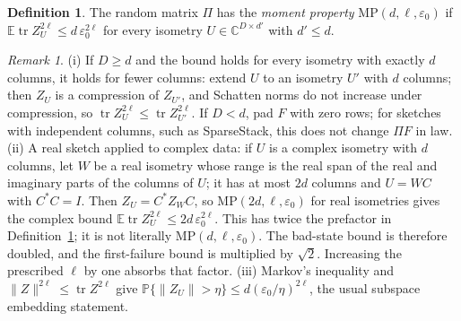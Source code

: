 \documentclass[11pt]{article}
\theoremstyle{definition}\newtheorem{definition}[theorem]{Definition}
\theoremstyle{remark}\newtheorem{remark}[theorem]{Remark}
\newcommand{\C}{\mathbb C}
\newcommand{\E}{\mathbb E}
\newcommand{\Prob}{\mathbb P}
\newcommand{\eps}{\varepsilon}
\newcommand{\tr}{\operatorname{tr}}
\newcommand{\1}{\mathbf 1}
\newcommand{\MP}{\mathrm{MP}}
\begin{document}
\begin{definition}\label{def:MP}
The random matrix $\Pi$ has the \emph{moment property}
$\MP(d,\ell,\eps_0)$ if
$\E\tr Z_U^{2\ell}\le d\,\eps_0^{2\ell}$ for every isometry
$U\in\C^{D\times d'}$ with $d'\le d$.
\end{definition}

\begin{remark}\label{rem:MP}
(i) If $D\ge d$ and the bound holds for every isometry with exactly $d$
columns, it holds for fewer columns: extend $U$ to an isometry $U'$ with
$d$ columns; then $Z_U$ is a compression of $Z_{U'}$, and Schatten norms
do not increase under compression, so
$\tr Z_U^{2\ell}\le\tr Z_{U'}^{2\ell}$. If $D<d$, pad $F$ with zero
rows; for sketches with independent columns, such as SparseStack, this
does not change $\Pi F$ in law.
(ii) A real sketch applied to complex data: if $U$ is a complex isometry
with $d$ columns, let $W$ be a real isometry whose range is the real
span of the real and imaginary parts of the columns of $U$; it has at
most $2d$ columns and $U=WC$ with $C^*C=I$. Then $Z_U=C^*Z_WC$, so
$\MP(2d,\ell,\eps_0)$ for real isometries gives the complex bound
$\E\tr Z_U^{2\ell}\le2d\,\eps_0^{2\ell}$. This has twice the prefactor
in Definition~\ref{def:MP}; it is not literally $\MP(d,\ell,\eps_0)$.
The bad-state bound is therefore doubled, and the first-failure bound
is multiplied by $\sqrt2$. Increasing the prescribed $\ell$ by one
absorbs that factor.
(iii) Markov's inequality and $\|Z\|^{2\ell}\le\tr Z^{2\ell}$ give
$\Prob\{\|Z_U\|>\eta\}\le d(\eps_0/\eta)^{2\ell}$, the usual subspace
embedding statement.
\end{remark}
\end{document}

